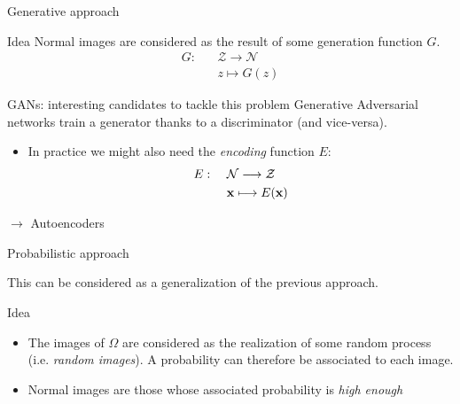 \documentclass[xcolor=pdftex,dvipsnames,table,mathserif]{beamer}
\begin{document}
\begin{frame}{Generative approach}

  \begin{block}{Idea}
    Normal images are considered as the result of some generation function $G$.
    \[
    \begin{split}
    G: & ~~~~\mathcal{Z} \longrightarrow \mathcal{N} \\
    & ~~~~ z \longmapsto G(z)
    \end{split}
    \]
  \end{block}

  \begin{alertblock}{GANs: interesting candidates to tackle this problem}
    Generative Adversarial networks train a \alert{generator} thanks to a \alert{discriminator} (and vice-versa).
  \end{alertblock}

\pause

\begin{itemize}
\item In practice we might also need the \emph{encoding} function $E$:
    \[
    \begin{split}
    E: & ~~~~\mathcal{N} \longrightarrow \mathcal{Z} \\
    & ~~~~ \mathbf{x} \longmapsto E(\mathbf{x})
    \end{split}
    \]
\end{itemize}

\begin{alertblock}{}
  $\longrightarrow$ Autoencoders
\end{alertblock}

\end{frame}


\begin{frame}{Probabilistic approach}

This can be considered as a generalization of the previous approach.

\begin{block}{Idea}

  \begin{itemize}
  \item   The images of $\Omega$ are considered as the realization of some random process (i.e. \emph{random images}). A probability can therefore be associated to each image.
  \item Normal images are those whose associated probability is \emph{high enough}
  \end{itemize}

\end{block}



\end{frame}
\end{document}
